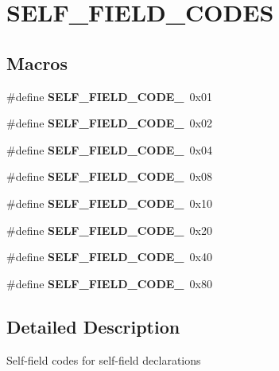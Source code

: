 \hypertarget{group___s_e_l_f___f_i_e_l_d___c_o_d_e_s}{}\section{S\+E\+L\+F\+\_\+\+F\+I\+E\+L\+D\+\_\+\+C\+O\+D\+ES}
\label{group___s_e_l_f___f_i_e_l_d___c_o_d_e_s}
\subsection*{Macros}
\begin{DoxyCompactItemize}
\item 
\mbox{\label{group___s_e_l_f___f_i_e_l_d___c_o_d_e_s_gab2c5ba5bdc06db52d60447bae0760509}} 
\#define {\bfseries S\+E\+L\+F\+\_\+\+F\+I\+E\+L\+D\+\_\+\+C\+O\+D\+E\+\_}~0x01
\item 
\mbox{\label{group___s_e_l_f___f_i_e_l_d___c_o_d_e_s_gac8178ac0758dae67d137eb51645a7684}} 
\#define {\bfseries S\+E\+L\+F\+\_\+\+F\+I\+E\+L\+D\+\_\+\+C\+O\+D\+E\+\_}~0x02
\item 
\mbox{\label{group___s_e_l_f___f_i_e_l_d___c_o_d_e_s_gabfc866dd924b5f689363d727590cb234}} 
\#define {\bfseries S\+E\+L\+F\+\_\+\+F\+I\+E\+L\+D\+\_\+\+C\+O\+D\+E\+\_}~0x04
\item 
\mbox{\label{group___s_e_l_f___f_i_e_l_d___c_o_d_e_s_ga77568ab45baf37856210e7877a6859fe}} 
\#define {\bfseries S\+E\+L\+F\+\_\+\+F\+I\+E\+L\+D\+\_\+\+C\+O\+D\+E\+\_}~0x08
\item 
\mbox{\label{group___s_e_l_f___f_i_e_l_d___c_o_d_e_s_ga3121fc536090460c8fba97fbd70ca897}} 
\#define {\bfseries S\+E\+L\+F\+\_\+\+F\+I\+E\+L\+D\+\_\+\+C\+O\+D\+E\+\_}~0x10
\item 
\mbox{\label{group___s_e_l_f___f_i_e_l_d___c_o_d_e_s_ga3f61ab46d8f5e9dc9e1e8e4dad3cb331}} 
\#define {\bfseries S\+E\+L\+F\+\_\+\+F\+I\+E\+L\+D\+\_\+\+C\+O\+D\+E\+\_}~0x20
\item 
\mbox{\label{group___s_e_l_f___f_i_e_l_d___c_o_d_e_s_gada65e5038b0c69cd34f6f24fd3388cc4}} 
\#define {\bfseries S\+E\+L\+F\+\_\+\+F\+I\+E\+L\+D\+\_\+\+C\+O\+D\+E\+\_}~0x40
\item 
\mbox{\label{group___s_e_l_f___f_i_e_l_d___c_o_d_e_s_gad4cf02f64b6e768e163d62cd1ecbd827}} 
\#define {\bfseries S\+E\+L\+F\+\_\+\+F\+I\+E\+L\+D\+\_\+\+C\+O\+D\+E\+\_}~0x80
\end{DoxyCompactItemize}


\subsection{Detailed Description}
Self-\/field codes for self-\/field declarations 